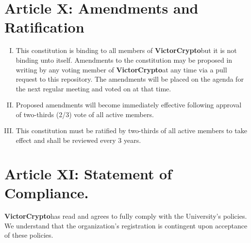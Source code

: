 \documentclass[11pt]{article}
\newcommand{\orgname}{\textbf{VictorCrypto}}
\begin{document}
    \section{Article X: Amendments and Ratification}
    \begin{enumerate}[I.]
        \item This constitution is binding to all members of \orgname but it is not binding unto itself.
        Amendments to the constitution may be proposed in writing by any voting member of \orgname at any time via a pull request to this repository.
        The amendments will be placed on the agenda for the next regular meeting and voted on at that time.
        \item Proposed amendments will become immediately effective following approval of two-thirds (2/3) vote of all active members.
        \item This constitution must be ratified by two-thirds of all active members to take effect and shall be reviewed every 3 years.
    \end{enumerate}


    \section{Article XI: Statement of Compliance.}
    \orgname has read and agrees to fully comply with the University's policies.
    We understand that the organization's registration is contingent upon acceptance of these policies.
\end{document}
